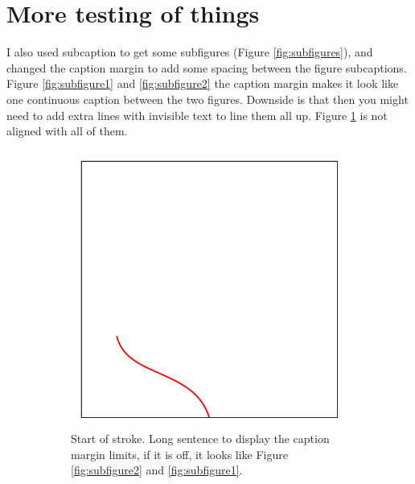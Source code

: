\section{More testing of things}
I also used subcaption to get some subfigures (Figure \ref{fig:subfigures}), and changed the caption margin to add some spacing between the figure subcaptions. Figure \ref{fig:subfigure1} and \ref{fig:subfigure2} the caption margin makes it look like one continuous caption between the two figures. Downside is that then you might need to add extra lines with invisible text to line them all up. Figure \ref{fig:subfigure0} is not aligned with all of them.
\begin{figure}
    \centering
    \begin{subfigure}[h!]{0.32\textwidth}\captionsetup{margin=0.25cm}
        \includegraphics[width=\linewidth]{img/subfolder1/cilia_img0.png}
        \caption{Start of stroke. Long sentence to display the caption margin limits, if it is off, it looks like Figure \ref{fig:subfigure2} and \ref{fig:subfigure1}.}
        \label{fig:subfigure0}
    \end{subfigure}
    \begin{subfigure}[h!]{0.32\textwidth}%

\end{subfigure}
\end{figure}
